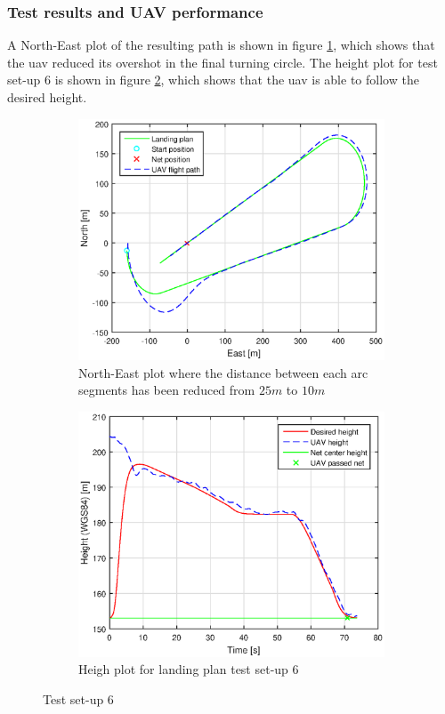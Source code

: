 \subsubsection{Test results and UAV performance}
A North-East plot of the resulting path is shown in figure \ref{Fig:NorthEast1juni083423}, which shows that the \gls{uav} reduced its overshot in the final turning circle. The height plot for test set-up 6 is shown in figure \ref{Fig:Height1juni083423}, which shows that the \gls{uav} is able to follow the desired height.
\newpage
\begin{figure}[H]
\centering
\begin{subfigure}{0.7\textwidth}
		\includegraphics[width=\textwidth]{figs/Experiment/NorthEast1juni083423.eps}
\caption{North-East plot where the distance between each arc segments has been reduced from $25 m$ to $10 m$}
\label{Fig:NorthEast1juni083423}
\end{subfigure}
\begin{subfigure}{0.7\textwidth}
		\includegraphics[width=\textwidth]{figs/Experiment/Height1juni083423.eps}
\caption{Heigh plot for landing plan test set-up 6}
\label{Fig:Height1juni083423}
\end{subfigure}
\caption{Test set-up 6}
\label{Fig:Test6}
\end{figure}

